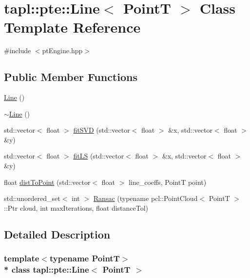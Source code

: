 \hypertarget{classtapl_1_1pte_1_1Line}{}\section{tapl\+:\+:pte\+:\+:Line$<$ PointT $>$ Class Template Reference}
\label{classtapl_1_1pte_1_1Line}


{\ttfamily \#include $<$pt\+Engine.\+hpp$>$}

\subsection*{Public Member Functions}
\begin{DoxyCompactItemize}
\item 
\hyperlink{classtapl_1_1pte_1_1Line_a3484fb0de3bc1bcf2bb22b4943330979}{Line} ()
\item 
\hyperlink{classtapl_1_1pte_1_1Line_a3ef1f4fbb2ae11c564176fffc4befe74}{$\sim$\+Line} ()
\item 
std\+::vector$<$ float $>$ \hyperlink{classtapl_1_1pte_1_1Line_aa1de142cfa7dd5b26093a99df05d9f8c}{fit\+S\+VD} (std\+::vector$<$ float $>$ \&x, std\+::vector$<$ float $>$ \&y)
\item 
std\+::vector$<$ float $>$ \hyperlink{classtapl_1_1pte_1_1Line_a705b09b731117dae2d47d91a423ff828}{fit\+LS} (std\+::vector$<$ float $>$ \&x, std\+::vector$<$ float $>$ \&y)
\item 
float \hyperlink{classtapl_1_1pte_1_1Line_a97f6d7505cead12ac6f82d84ca0bf92a}{dist\+To\+Point} (std\+::vector$<$ float $>$ line\+\_\+coeffs, PointT point)
\item 
std\+::unordered\+\_\+set$<$ int $>$ \hyperlink{classtapl_1_1pte_1_1Line_a50a79f0b345fd3b9fb830a035ccf8e1d}{Ransac} (typename pcl\+::\+Point\+Cloud$<$ PointT $>$\+::Ptr cloud, int max\+Iterations, float distance\+Tol)
\end{DoxyCompactItemize}


\subsection{Detailed Description}
\subsubsection*{template$<$typename PointT$>$\\*
class tapl\+::pte\+::\+Line$<$ Point\+T $>$}



